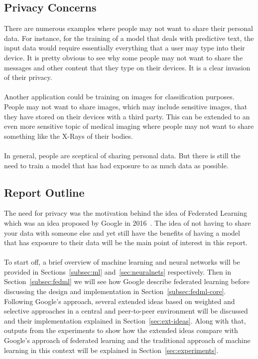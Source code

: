 \documentclass[12pt]{article}
\begin{document}
\subsection{Privacy Concerns}
There are numerous examples where people may not want to share their personal data. For instance, for the training of a model that deals with predictive text, the input data would require essentially everything that a user may type into their device. It is pretty obvious to see why some people may not want to share the messages and other content that they type on their devices. It is a clear invasion of their privacy.
\\\\
Another application could be training on images for classification purposes. People may not want to share images, which may include sensitive images, that they have stored on their devices with a third party. This can be extended to an even more sensitive topic of medical imaging where people may not want to share something like the X-Rays of their bodies.
\\\\
In general, people are sceptical of sharing personal data. But there is still the need to train a model that has had exposure to as much data as possible. 
\subsection{Report Outline}
The need for privacy was the motivation behind the idea of Federated Learning which was an idea proposed by Google in 2016~\cite{mcmahan2016communication}. The idea of not having to share your data with someone else and yet still have the benefits of having a model that has exposure to their data will be the main point of interest in this report. 
\\\\
To start off, a brief overview of machine learning and neural networks will be provided in Sections~\ref{subsec:ml} and~\ref{sec:neuralnets} respectively. Then in Section~\ref{subsec:fedml} we will see how Google describe federated learning before discussing the design and implementation in Section~\ref{subsec:fedml-core}. Following Google's approach, several extended ideas based on weighted and selective approaches in a central and peer-to-peer environment will be discussed and their implementation explained in Section~\ref{sec:ext-ideas}. Along with that, outputs from the experiments to show how the extended ideas compare with Google's approach of federated learning and the traditional approach of machine learning in this context will be explained in Section~\ref{sec:experiments}. 
\end{document}
